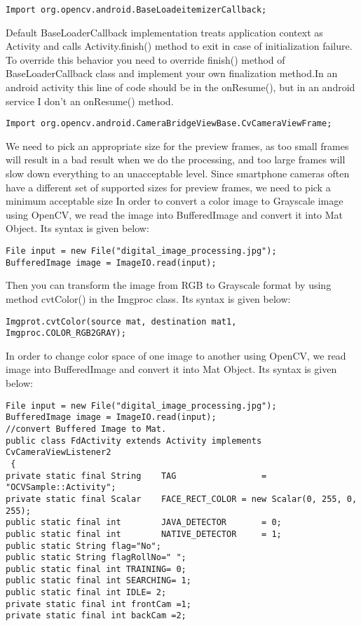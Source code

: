 \begin{lstlisting}
Import org.opencv.android.BaseLoadeitemizerCallback;
\end{lstlisting}

Default BaseLoaderCallback implementation treats application context as Activity and calls Activity.finish() method to exit in case of initialization failure. To override this behavior you need to override finish() method of BaseLoaderCallback class and implement your own finalization method.In an android activity this line of code should be in the onResume(), but in an android service I don't an onResume() method.

\begin{lstlisting}
Import org.opencv.android.CameraBridgeViewBase.CvCameraViewFrame;
\end{lstlisting}

We need to pick an appropriate size for the preview frames, as too small frames will result in a bad result when we do the processing, and too large frames will slow down everything to an unacceptable level. Since smartphone cameras often have a different set of supported sizes for preview frames, we need to pick a minimum acceptable size
In order to convert a color image to Grayscale image using OpenCV, we read the image into BufferedImage and convert it into Mat Object. Its syntax is given below:

\begin{lstlisting}
File input = new File("digital_image_processing.jpg");
BufferedImage image = ImageIO.read(input);
\end{lstlisting}


Then you can transform the image from RGB to Grayscale format by using method cvtColor() in the Imgproc class. Its syntax is given below:

\begin{lstlisting}
Imgprot.cvtColor(source mat, destination mat1, Imgproc.COLOR_RGB2GRAY);
\end{lstlisting}

In order to change color space of one image to another using OpenCV, we read image into BufferedImage and convert it into Mat Object. Its syntax is given below:

\begin{lstlisting}
File input = new File("digital_image_processing.jpg");
BufferedImage image = ImageIO.read(input);
//convert Buffered Image to Mat.
public class FdActivity extends Activity implements CvCameraViewListener2
 {
private static final String    TAG                 = "OCVSample::Activity";
private static final Scalar    FACE_RECT_COLOR = new Scalar(0, 255, 0, 255);
public static final int        JAVA_DETECTOR       = 0;
public static final int        NATIVE_DETECTOR     = 1;
public static String flag="No";
public static String flagRollNo=" ";
public static final int TRAINING= 0;
public static final int SEARCHING= 1;
public static final int IDLE= 2;
private static final int frontCam =1;
private static final int backCam =2;
\end{lstlisting}

